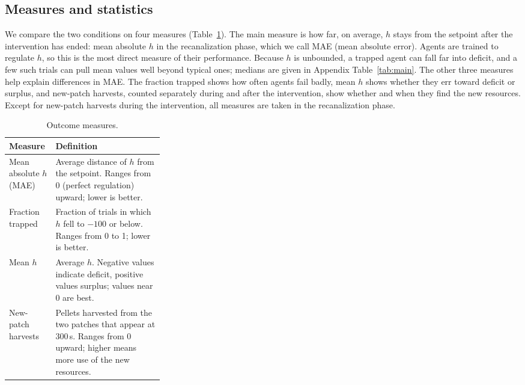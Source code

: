 \documentclass[12pt,fleqn]{article}
\begin{document}
\subsection{Measures and statistics}\label{sec:stats}

We compare the two conditions on four measures (Table~\ref{tab:measures}). The main measure is how far, on average, $h$ stays from the setpoint after the intervention has ended: mean absolute $h$ in the recanalization phase, which we call MAE (mean absolute error). Agents are trained to regulate $h$, so this is the most direct measure of their performance. Because $h$ is unbounded, a trapped agent can fall far into deficit, and a few such trials can pull mean values well beyond typical ones; medians are given in Appendix Table~\ref{tab:main}. The other three measures help explain differences in MAE. The fraction trapped shows how often agents fail badly, mean $h$ shows whether they err toward deficit or surplus, and new-patch harvests, counted separately during and after the intervention, show whether and when they find the new resources. Except for new-patch harvests during the intervention, all measures are taken in the recanalization phase.

\begin{table}[htbp]
\centering\small
\renewcommand{\arraystretch}{1.15}
\begin{tabularx}{\linewidth}{@{}>{\raggedright\arraybackslash}p{0.3\linewidth}X@{}}
\toprule
Measure & Definition\\
\midrule
Mean absolute $h$ (MAE) & Average distance of $h$ from the setpoint. Ranges from 0 (perfect regulation) upward; lower is better.\\
Fraction trapped & Fraction of trials in which $h$ fell to $-100$ or below. Ranges from 0 to 1; lower is better.\\
Mean $h$ & Average $h$. Negative values indicate deficit, positive values surplus; values near 0 are best.\\
New-patch harvests & Pellets harvested from the two patches that appear at 300\,s. Ranges from 0 upward; higher means more use of the new resources.\\
\bottomrule
\end{tabularx}
\caption{Outcome measures.}
\label{tab:measures}
\end{table}
\end{document}
